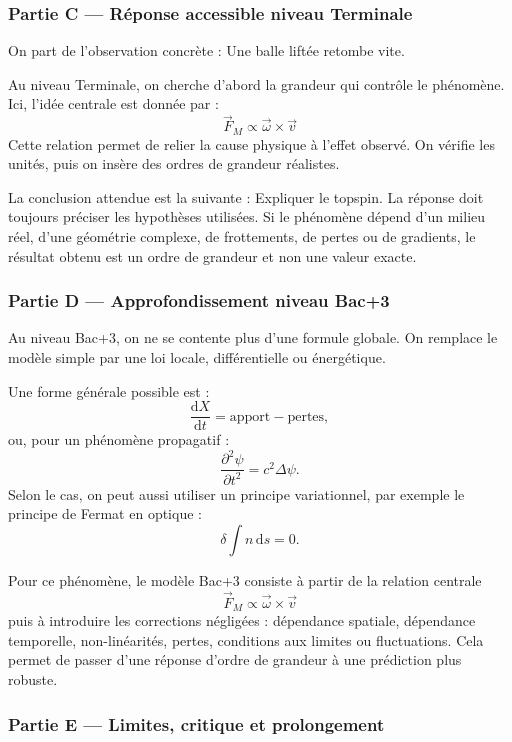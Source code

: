 \documentclass[11pt,a4paper]{article}
\begin{document}
\subsubsection*{Partie C — Réponse accessible niveau Terminale}

\begin{corrigebox}
On part de l'observation concrète : Une balle liftée retombe vite.

Au niveau Terminale, on cherche d'abord la grandeur qui contrôle le phénomène. Ici, l'idée centrale est donnée par :
\[
\vec F_M\propto\vec\omega\times\vec v
\]
Cette relation permet de relier la cause physique à l'effet observé. On vérifie les unités, puis on insère des ordres de grandeur réalistes.

La conclusion attendue est la suivante : Expliquer le topspin. La réponse doit toujours préciser les hypothèses utilisées. Si le phénomène dépend d'un milieu réel, d'une géométrie complexe, de frottements, de pertes ou de gradients, le résultat obtenu est un ordre de grandeur et non une valeur exacte.
\end{corrigebox}

\subsubsection*{Partie D — Approfondissement niveau Bac+3}

\begin{approfondissementbox}
Au niveau Bac+3, on ne se contente plus d'une formule globale. On remplace le modèle simple par une loi locale, différentielle ou énergétique.

Une forme générale possible est :
\[
\frac{\mathrm d X}{\mathrm dt}=\text{apport}-\text{pertes},
\]
ou, pour un phénomène propagatif :
\[
\frac{\partial^2 \psi}{\partial t^2}=c^2\Delta\psi.
\]
Selon le cas, on peut aussi utiliser un principe variationnel, par exemple le principe de Fermat en optique :
\[
\delta \int n\,\mathrm ds=0.
\]

Pour ce phénomène, le modèle Bac+3 consiste à partir de la relation centrale
\[
\vec F_M\propto\vec\omega\times\vec v
\]
puis à introduire les corrections négligées : dépendance spatiale, dépendance temporelle, non-linéarités, pertes, conditions aux limites ou fluctuations. Cela permet de passer d'une réponse d'ordre de grandeur à une prédiction plus robuste.
\end{approfondissementbox}

\subsubsection*{Partie E — Limites, critique et prolongement}
\end{document}
